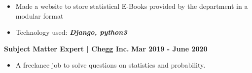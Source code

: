 \documentclass[10pt]{article}
\begin{document}
\begin{itemize}
\item Made a website to store statistical E-Books provided by the department in a modular format\\[-1.9em]
    \item Technology used: \textit{\textbf{Django, python3}}\\[-1.25em]
\end{itemize}
\large { \textbf{Subject Matter Expert | Chegg Inc. }} \normalsize
\href{https://github.com/vezcraz/Credentials/blob/master/Verification\%20Docs/chegg.png} {\hspace{0.5ex}\faMousePointer} {\hfill}\textbf{Mar 2019 - June 2020}\\[-1.9em]

\begin{itemize}
\item A freelance job to solve questions on statistics and probability.\\[-2em]
\end{itemize}

\vspace{-0.5ex}


\end{document}
